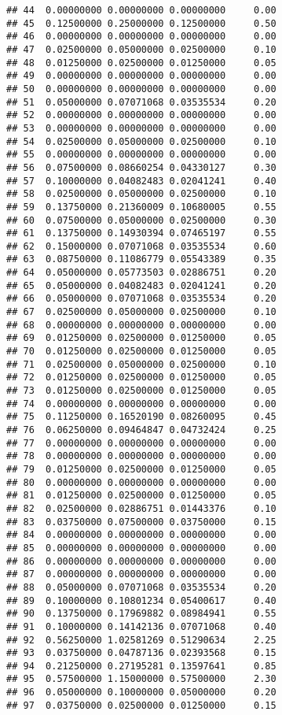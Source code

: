 \documentclass[
]{article}
\begin{document}
\begin{verbatim}
## 44  0.00000000 0.00000000 0.00000000     0.00
## 45  0.12500000 0.25000000 0.12500000     0.50
## 46  0.00000000 0.00000000 0.00000000     0.00
## 47  0.02500000 0.05000000 0.02500000     0.10
## 48  0.01250000 0.02500000 0.01250000     0.05
## 49  0.00000000 0.00000000 0.00000000     0.00
## 50  0.00000000 0.00000000 0.00000000     0.00
## 51  0.05000000 0.07071068 0.03535534     0.20
## 52  0.00000000 0.00000000 0.00000000     0.00
## 53  0.00000000 0.00000000 0.00000000     0.00
## 54  0.02500000 0.05000000 0.02500000     0.10
## 55  0.00000000 0.00000000 0.00000000     0.00
## 56  0.07500000 0.08660254 0.04330127     0.30
## 57  0.10000000 0.04082483 0.02041241     0.40
## 58  0.02500000 0.05000000 0.02500000     0.10
## 59  0.13750000 0.21360009 0.10680005     0.55
## 60  0.07500000 0.05000000 0.02500000     0.30
## 61  0.13750000 0.14930394 0.07465197     0.55
## 62  0.15000000 0.07071068 0.03535534     0.60
## 63  0.08750000 0.11086779 0.05543389     0.35
## 64  0.05000000 0.05773503 0.02886751     0.20
## 65  0.05000000 0.04082483 0.02041241     0.20
## 66  0.05000000 0.07071068 0.03535534     0.20
## 67  0.02500000 0.05000000 0.02500000     0.10
## 68  0.00000000 0.00000000 0.00000000     0.00
## 69  0.01250000 0.02500000 0.01250000     0.05
## 70  0.01250000 0.02500000 0.01250000     0.05
## 71  0.02500000 0.05000000 0.02500000     0.10
## 72  0.01250000 0.02500000 0.01250000     0.05
## 73  0.01250000 0.02500000 0.01250000     0.05
## 74  0.00000000 0.00000000 0.00000000     0.00
## 75  0.11250000 0.16520190 0.08260095     0.45
## 76  0.06250000 0.09464847 0.04732424     0.25
## 77  0.00000000 0.00000000 0.00000000     0.00
## 78  0.00000000 0.00000000 0.00000000     0.00
## 79  0.01250000 0.02500000 0.01250000     0.05
## 80  0.00000000 0.00000000 0.00000000     0.00
## 81  0.01250000 0.02500000 0.01250000     0.05
## 82  0.02500000 0.02886751 0.01443376     0.10
## 83  0.03750000 0.07500000 0.03750000     0.15
## 84  0.00000000 0.00000000 0.00000000     0.00
## 85  0.00000000 0.00000000 0.00000000     0.00
## 86  0.00000000 0.00000000 0.00000000     0.00
## 87  0.00000000 0.00000000 0.00000000     0.00
## 88  0.05000000 0.07071068 0.03535534     0.20
## 89  0.10000000 0.10801234 0.05400617     0.40
## 90  0.13750000 0.17969882 0.08984941     0.55
## 91  0.10000000 0.14142136 0.07071068     0.40
## 92  0.56250000 1.02581269 0.51290634     2.25
## 93  0.03750000 0.04787136 0.02393568     0.15
## 94  0.21250000 0.27195281 0.13597641     0.85
## 95  0.57500000 1.15000000 0.57500000     2.30
## 96  0.05000000 0.10000000 0.05000000     0.20
## 97  0.03750000 0.02500000 0.01250000     0.15

\end{verbatim}
\end{document}
